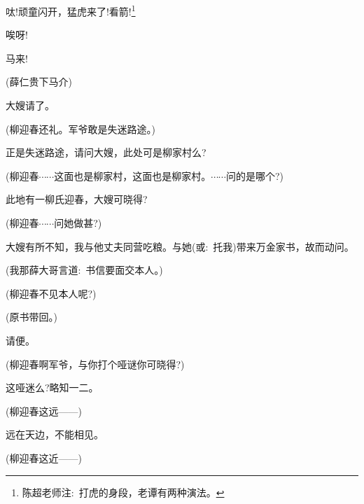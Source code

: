 {呔!顽童闪开，猛虎来了!看箭!\footnote{陈超老师注:~打虎的身段，老谭有两种演法。}

唉呀!


\vspace{5pt}

马来!



(薛仁贵{\hwfs 下马介})


大嫂请了。

(柳迎春\hspace{20pt}还礼。军爷敢是失迷路途。)

正是失迷路途，请问大嫂，此处可是柳家村么?

(柳迎春\hspace{20pt}$\cdots{}\cdots{}$这面也是柳家村，这面也是柳家村。$\cdots{}\cdots{}$问的是哪个?)

此地有一柳氏迎春，大嫂可晓得?

(柳迎春\hspace{20pt}$\cdots{}\cdots{}$问她做甚?)

大嫂有所不知，我与他丈夫同营吃粮。与她({\akai 或}:~托我)带来万金家书，故而动问。

(我那薛大哥言道:~书信要面交本人。)

(柳迎春\hspace{20pt}不见本人呢?)

(原书带回。)

请便。

(柳迎春\hspace{20pt}啊军爷，与你打个哑谜你可晓得?)

这哑迷么?略知一二。

(柳迎春\hspace{20pt}这远------)

远在天边，不能相见。

(柳迎春\hspace{20pt}这近------)

}
